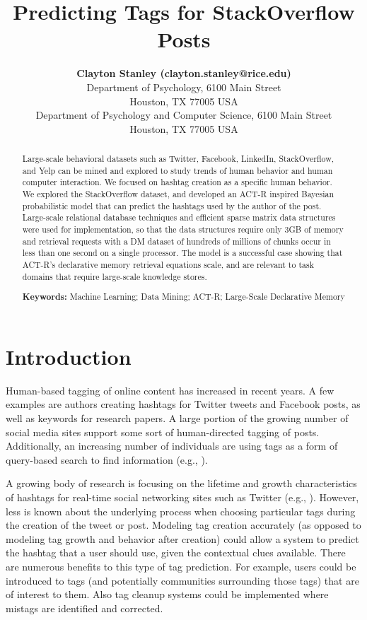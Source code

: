 \documentclass[10pt,letterpaper]{article}
\title{Predicting Tags for StackOverflow Posts}
\author{{\large \bf Clayton Stanley (clayton.stanley@rice.edu)} \\
  Department of Psychology, 6100 Main Street \\
  Houston, TX 77005 USA 
  \AND {\large \bf Michael D. Byrne (byrne@rice.edu)} \\
  Department of Psychology and Computer Science, 6100 Main Street \\
  Houston, TX 77005 USA }
\begin{document}
\maketitle

\frenchspacing

\begin{abstract}
  Large-scale behavioral datasets such as Twitter, Facebook, LinkedIn, StackOverflow, and Yelp can be mined and explored to study trends of human behavior and human computer interaction.
  We focused on hashtag creation as a specific human behavior.
  We explored the StackOverflow dataset, and developed an ACT-R inspired Bayesian probabilistic model that can predict the hashtags used by the author of the post.
  Large-scale relational database techniques and efficient sparse matrix data structures were used for implementation,
  so that the data structures require only 3GB of memory and retrieval requests with a DM dataset of hundreds of millions of chunks occur in less than one second on a single processor.
  The model is a successful case showing that ACT-R's declarative memory retrieval equations scale, and are relevant to task domains that require large-scale knowledge stores.

  \textbf{Keywords:}
  Machine Learning; Data Mining; ACT-R; Large-Scale Declarative Memory
\end{abstract}

\section{Introduction}

Human-based tagging of online content has increased in recent years.
A few examples are authors creating hashtags for Twitter tweets and Facebook posts, as well as keywords for research papers.
A large portion of the growing number of social media sites support some sort of human-directed tagging of posts.
Additionally, an increasing number of individuals are using tags as a form of query-based search to find information
(e.g., ).

A growing body of research is focusing on the lifetime and growth characteristics of hashtags for real-time social networking sites such as Twitter
(e.g., ).
However, less is known about the underlying process when choosing particular tags during the creation of the tweet or post.
Modeling tag creation accurately (as opposed to modeling tag growth and behavior after creation) could allow a system to predict the hashtag that a user should use, given the contextual clues available.
There are numerous benefits to this type of tag prediction.
For example, users could be introduced to tags (and potentially communities surrounding those tags) that are of interest to them.
Also tag cleanup systems could be implemented where mistags are identified and corrected.
\end{document}
